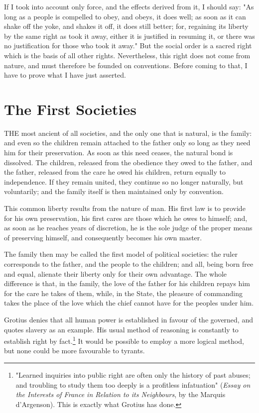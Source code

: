 \documentclass[12pt]{report}
\begin{document}
If I took into account only force, and the effects derived from it, I should say: "As long as a people is compelled to obey, and obeys, it does well; as soon as it can shake off the yoke, and shakes it off, it does still better; for, regaining its liberty by the same right as took it away, either it is justified in resuming it, or there was no justification for those who took it away." But the social order is a sacred right which is the basis of all other rights. Nevertheless, this right does not come from nature, and must therefore be founded on conventions. Before coming to that, I have to prove what I have just asserted.
\section{The First Societies}
THE most ancient of all societies, and the only one that is natural, is the family: and even so the children remain attached to the father only so long as they need him for their preservation. As soon as this need ceases, the natural bond is dissolved. The children, released from the obedience they owed to the father, and the father, released from the care he owed his children, return equally to independence. If they remain united, they continue so no longer naturally, but voluntarily; and the family itself is then maintained only by convention.

This common liberty results from the nature of man. His first law is to provide for his own preservation, his first cares are those which he owes to himself; and, as soon as he reaches years of discretion, he is the sole judge of the proper means of preserving himself, and consequently becomes his own master.

The family then may be called the first model of political societies: the ruler corresponds to the father, and the people to the children; and all, being born free and equal, alienate their liberty only for their own advantage. The whole difference is that, in the family, the love of the father for his children repays him for the care he takes of them, while, in the State, the pleasure of commanding takes the place of the love which the chief cannot have for the peoples under him.

Grotius denies that all human power is established in favour of the governed, and quotes slavery as an example. His usual method of reasoning is constantly to establish right by fact.\footnote{"Learned inquiries into public right are often only the history of past abuses; and troubling to study them too deeply is a profitless infatuation" (\textit{Essay on the Interests of France in Relation to its Neighbours}, by the Marquis d'Argenson). This is exactly what Grotius has done.} It would be possible to employ a more logical method, but none could be more favourable to tyrants.
\end{document}
